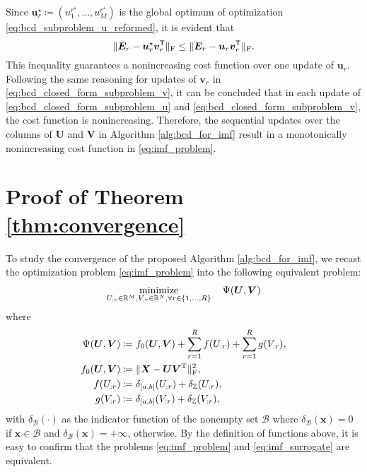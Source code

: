 Since $\bm{u}_r^\star \coloneqq (u^{r^\star}_1,\dots,u^{r^\star}_M)$ is the global optimum of optimization \eqref{eq:bcd_subproblem_u_reformed}, it is evident that
\begin{equation}
    \|\bm{E}_r - \bm{u}_r^\star \bm{v}_r^\mathsf{T}\|_{\rm F}  \leq \|\bm{E}_r - \bm{u}_r \bm{v}_r^\mathsf{T}\|_{\rm F}.
\end{equation}
This inequality guarantees a nonincreasing cost function over one update of $\bm u_r$. Following the same reasoning for updates of $\bm v_r$ in \eqref{eq:bcd_closed_form_subproblem_v}, it can be concluded that in each update of \eqref{eq:bcd_closed_form_subproblem_u} and \eqref{eq:bcd_closed_form_subproblem_v}, the cost function is nonincreasing. Therefore, the sequential updates over the columns of $\bm U$ and $\bm V$ in Algorithm \ref{alg:bcd_for_imf} result in a monotonically nonincreasing cost function in \eqref{eq:imf_problem}.


\section{Proof of Theorem \ref{thm:convergence}} \label{app:convergence_proof}

To study the convergence of the proposed Algorithm \ref{alg:bcd_for_imf}, we recast the optimization problem \eqref{eq:imf_problem} into the following equivalent problem:
\begin{align}
    \begin{split}
        \operatorname*{minimize}_{U_{:r} \in \mathbb{R}^{M}, V_{:r} \in \mathbb{R}^{N}, \forall r\in\{1,...,R\}} \quad \Psi(\bm U, \bm V)
    \end{split}
    \label{eq:imf_surrogate}
\end{align}
where
\begin{align*}
    \Psi(\bm U, \bm V) & \coloneqq f_0(\bm U, \bm V) + \sum_{r=1}^R f(U_{:r}) + \sum_{r=1}^R g(V_{:r}), \\
    f_0(\bm U, \bm V)  & \coloneqq \|\bm X - \bm U \bm V^{\rm T} \|_{\rm F}^2,                          \\
    f(U_{:r})          & \coloneqq \delta_{[a,b]}(U_{:r}) + \delta_{\mathbb{Z}}(U_{:r}),                          \\
    g(V_{:r})          & \coloneqq \delta_{[a,b]}(V_{:r}) + \delta_{\mathbb{Z}}(V_{:r}),
\end{align*}
with $\delta_\mathcal{B}(\cdot)$ as the indicator function of the nonempty set $\mathcal{B}$ where $\delta_\mathcal{B}(\bm x) = 0$ if $\bm x \in \mathcal{B}$ and $\delta_\mathcal{B}(\bm x) = +\infty$, otherwise. By the definition of functions above, it is easy to confirm that the problems \eqref{eq:imf_problem} and \eqref{eq:imf_surrogate} are equivalent.

